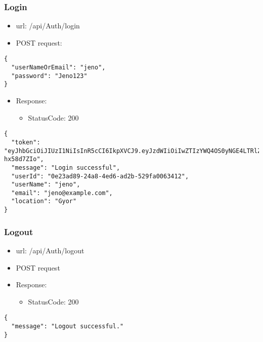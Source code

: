 \documentclass[11pt]{article}
\begin{document}
\subsubsection{Login}
\label{sec:org7ecbe47}
\begin{itemize}
\item url: /api/Auth/login
\item POST request:
\end{itemize}
\begin{verbatim}
{
  "userNameOrEmail": "jeno",
  "password": "Jeno123"
}
\end{verbatim}
\begin{itemize}
\item Response:
\begin{itemize}
\item StatusCode: 200
\end{itemize}
\end{itemize}
\begin{verbatim}
{
  "token": "eyJhbGciOiJIUzI1NiIsInR5cCI6IkpXVCJ9.eyJzdWIiOiIwZTIzYWQ4OS0yNGE4LTRlZDYtYWQyYi01MjlmYTAwNjM0MTIiLCJlbWFpbCI6Implbm9AZXhhbXBsZS5jb20iLCJ1bmlxdWVfbmFtZSI6Implbm8iLCJsb2NhdGlvbiI6Ikd5b3IiLCJodHRwOi8vc2NoZW1hcy5taWNyb3NvZnQuY29tL3dzLzIwMDgvMDYvaWRlbnRpdHkvY2xhaW1zL3JvbGUiOiJVc2VyIiwiZXhwIjoxNzQ2MTExNDc0LCJpc3MiOiJodHRwczovL3VuaXBvaW50LWI2aDZoNGN1Ym5jbWFmaGgucG9sYW5kY2VudHJhbC0wMS5henVyZXdlYnNpdGVzLm5ldCIsImF1ZCI6Imh0dHBzOi8vdW5pcG9pbnQtYjZoNmg0Y3VibmNtYWZoaC5wb2xhbmRjZW50cmFsLTAxLmF6dXJld2Vic2l0ZXMubmV0In0.Yqrw_p9m6FfKP49J7GGXv4539PPOohrFo-hx58d7ZIo",
  "message": "Login successful",
  "userId": "0e23ad89-24a8-4ed6-ad2b-529fa0063412",
  "userName": "jeno",
  "email": "jeno@example.com",
  "location": "Gyor"
}
\end{verbatim}
\subsubsection{Logout}
\label{sec:org7facf70}
\begin{itemize}
\item url: /api/Auth/logout
\item POST request
\item Response:
\begin{itemize}
\item StatusCode: 200
\end{itemize}
\end{itemize}
\begin{verbatim}
{
  "message": "Logout successful."
}
\end{verbatim}
\end{document}
